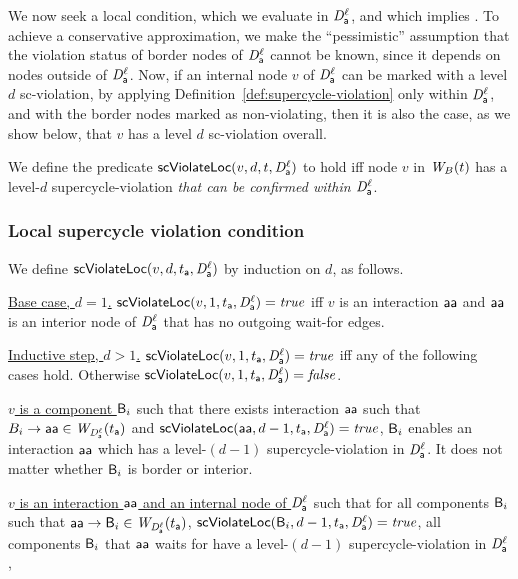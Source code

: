 
We now seek a local condition, which we evaluate in $\mathit{D}_{\mathsf{a}}^{\ell}$, and which implies \GAO.
To achieve a conservative approximation, we make the ``pessimistic'' assumption that the violation status of border
nodes of $\mathit{D}_{\mathsf{a}}^{\ell}$ cannot be known, since it depends on nodes outside of $\mathit{D}_{\mathsf{a}}^{\ell}$.
Now, if an internal node $v$ of $\mathit{D}_{\mathsf{a}}^{\ell}$ can be marked with a level $d$ sc-violation, by applying 
Definition~\ref{def:supercycle-violation} only within
$\mathit{D}_{\mathsf{a}}^{\ell}$, and with the border nodes marked as non-violating,
then it is also the case, as we show below, that $v$ has a level $d$ sc-violation overall.

We define the predicate $\mathsf{scViolateLoc}(v,d,t,\mathit{D}_{\mathsf{a}}^{\ell})$ to hold iff node $v$ in $\mathit{W}_{B}({t})$ has a level-$d$ supercycle-violation
\emph{that can be confirmed within $\mathit{D}_{\mathsf{a}}^{\ell}$}.


\subsubsection{Local supercycle violation condition}

\label{def:supercycle.violation.local}
We define $\mathsf{scViolateLoc}(v,d,t_{\mathsf{a}},\mathit{D}_{\mathsf{a}}^{\ell})$ by induction on $d$, as follows.

\noindent
\ul{Base case, $d=1$.} $\mathsf{scViolateLoc}(v,1,t_{\mathsf{a}},\mathit{D}_{\mathsf{a}}^{\ell}) = \mathit{true}$  iff
$v$ is an interaction $\mathsf{aa}$ and 
$\mathsf{aa}$ is an interior node of $\mathit{D}_{\mathsf{a}}^{\ell}$ that has no outgoing wait-for edges.


\noindent
\ul{Inductive step, $d > 1$.} $\mathsf{scViolateLoc}(v,1,t_{\mathsf{a}},\mathit{D}_{\mathsf{a}}^{\ell}) = \mathit{true}$ iff any of the following cases hold. Otherwise 
$\mathsf{scViolateLoc}(v,1,t_{\mathsf{a}},\mathit{D}_{\mathsf{a}}^{\ell}) = \mathit{false}$.

\be

\item \ul{$v$ is a component $\mathsf{B}_i$} such that there exists interaction $\mathsf{aa}$ such that $B_i \rightarrow \mathsf{aa} \in \mathit{W}_{\mathit{D}_{\mathsf{a}}^{\ell}}({t_{\mathsf{a}}})$ and $\mathsf{scViolateLoc}(\mathsf{aa},d-1,t_{\mathsf{a}},\mathit{D}_{\mathsf{a}}^{\ell}) = \mathit{true}$,
         \ie $\mathsf{B}_i$ enables an interaction $\mathsf{aa}$ which has a level-$(d-1)$ supercycle-violation in $\mathit{D}_{\mathsf{a}}^{\ell}$. 
It does not matter whether $\mathsf{B}_i$ is border or interior.


\item \ul{$v$ is an interaction $\mathsf{aa}$ and an internal node of $\mathit{D}_{\mathsf{a}}^{\ell}$} such that
   for all components $\mathsf{B}_i$ such that $\mathsf{aa} \rightarrow \mathsf{B}_i \in \mathit{W}_{\mathit{D}_{\mathsf{a}}^{\ell}}({t_{\mathsf{a}}})$, $\mathsf{scViolateLoc}(\mathsf{B}_i,d-1,t_{\mathsf{a}},\mathit{D}_{\mathsf{a}}^{\ell}) = \mathit{true}$,
         \ie all components $\mathsf{B}_i$ that $\mathsf{aa}$ waits for have a level-$(d-1)$ supercycle-violation in $\mathit{D}_{\mathsf{a}}^{\ell}$,

